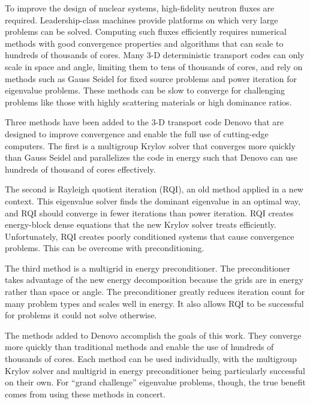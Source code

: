 
\noindent       %
To improve the design of nuclear systems, high-fidelity neutron fluxes are required. Leadership-class machines provide platforms on which very large problems can be solved. Computing such fluxes efficiently requires numerical methods with good convergence properties and algorithms that can scale to hundreds of thousands of cores. Many 3-D deterministic transport codes can only scale in space and angle, limiting them to tens of thousands of cores, and rely on methods such as Gauss Seidel for fixed source problems and power iteration for eigenvalue problems. These methods can be slow to converge for challenging problems like those with highly scattering materials or high dominance ratios. 

\vspace*{0.5em}
\noindent       %
Three methods have been added to the 3-D \Sn transport code Denovo that are designed to improve convergence and enable the full use of cutting-edge computers. The first is a multigroup Krylov solver that converges more quickly than Gauss Seidel and parallelizes the code in energy such that Denovo can use hundreds of thousand of cores effectively. 

\vspace*{0.5em}
\noindent       %
The second is Rayleigh quotient iteration (RQI), an old method applied in a new context. This eigenvalue solver finds the dominant eigenvalue in an optimal way, and RQI should converge in fewer iterations than power iteration. RQI creates energy-block dense equations that the new Krylov solver treats efficiently. Unfortunately, RQI creates poorly conditioned systems that cause convergence problems. This can be overcome with preconditioning. 

\vspace*{0.5em}
\noindent       %
The third method is a multigrid in energy preconditioner. The preconditioner takes advantage of the new energy decomposition because the grids are in energy rather than space or angle. The preconditioner greatly reduces iteration count for many problem types and scales well in energy. It also allows RQI to be successful for problems it could not solve otherwise. 

\vspace*{0.5em}
\noindent       %
The methods added to Denovo accomplish the goals of this work. They converge more quickly than traditional methods and enable the use of hundreds of thousands of cores. Each method can be used individually, with the multigroup Krylov solver and multigrid in energy preconditioner being particularly successful on their own. For ``grand challenge'' eigenvalue problems, though, the true benefit comes from using these methods in concert. 

